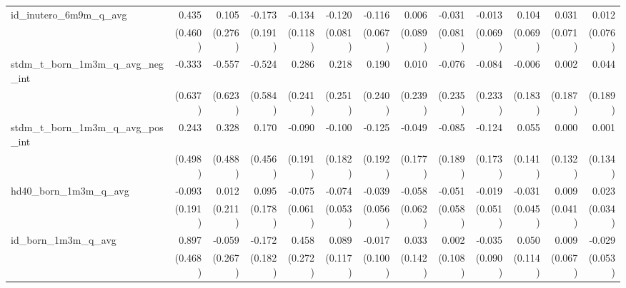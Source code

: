 \begin{tabular}{lrrrrrrrrrrrr}
id\_inutero\_6m9m\_q\_avg                   &        0.435 &        0.105 &       -0.173 &       -0.134 &       -0.120 &       -0.116 &        0.006 &       -0.031 &       -0.013 &        0.104 &        0.031 &        0.012 \\ 
                                            &      (0.460) &      (0.276) &      (0.191) &      (0.118) &      (0.081) &      (0.067) &      (0.089) &      (0.081) &      (0.069) &      (0.069) &      (0.071) &      (0.076) \\ 
stdm\_t\_born\_1m3m\_q\_avg\_neg\_int       &       -0.333 &       -0.557 &       -0.524 &        0.286 &        0.218 &        0.190 &        0.010 &       -0.076 &       -0.084 &       -0.006 &        0.002 &        0.044 \\ 
                                            &      (0.637) &      (0.623) &      (0.584) &      (0.241) &      (0.251) &      (0.240) &      (0.239) &      (0.235) &      (0.233) &      (0.183) &      (0.187) &      (0.189) \\ 
stdm\_t\_born\_1m3m\_q\_avg\_pos\_int       &        0.243 &        0.328 &        0.170 &       -0.090 &       -0.100 &       -0.125 &       -0.049 &       -0.085 &       -0.124 &        0.055 &        0.000 &        0.001 \\ 
                                            &      (0.498) &      (0.488) &      (0.456) &      (0.191) &      (0.182) &      (0.192) &      (0.177) &      (0.189) &      (0.173) &      (0.141) &      (0.132) &      (0.134) \\ 
hd40\_born\_1m3m\_q\_avg                    &       -0.093 &        0.012 &        0.095 &       -0.075 &       -0.074 &       -0.039 &       -0.058 &       -0.051 &       -0.019 &       -0.031 &        0.009 &        0.023 \\ 
                                            &      (0.191) &      (0.211) &      (0.178) &      (0.061) &      (0.053) &      (0.056) &      (0.062) &      (0.058) &      (0.051) &      (0.045) &      (0.041) &      (0.034) \\ 
id\_born\_1m3m\_q\_avg                      &        0.897 &       -0.059 &       -0.172 &        0.458 &        0.089 &       -0.017 &        0.033 &        0.002 &       -0.035 &        0.050 &        0.009 &       -0.029 \\ 
                                            &      (0.468) &      (0.267) &      (0.182) &      (0.272) &      (0.117) &      (0.100) &      (0.142) &      (0.108) &      (0.090) &      (0.114) &      (0.067) &      (0.053) \\ 

\end{tabular}
